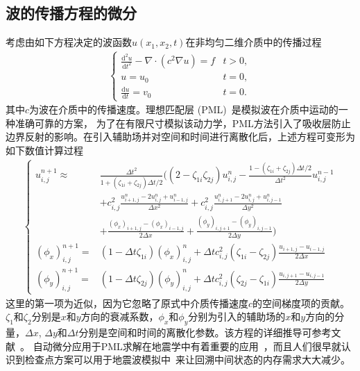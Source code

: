 \documentclass[A4,twoside,UTF8]{ctexart}
\def\D{\mathrm{d}}
\begin{document}
\baselineskip
\subsection{波的传播方程的微分}
考虑由如下方程决定的波函数$u(x_1, x_2, t)$在非均匀二维介质中的传播过程
\begin{align}
    \begin{cases}
    \frac{\D^2 u}{\D t^2} - \nabla\cdot(c^2\nabla u) = f & t>0,\\
    u = u_0 & t=0,\\
    \frac{\D u}{\D t} = v_0 & t=0.
    \end{cases}
\end{align}
其中$c$为波在介质中的传播速度。理想匹配层 (PML)~\cite{Berenger1994,Roden2000,MaKoEz08}是模拟波在介质中运动的一种准确可靠的方案，
为了在有限尺寸模拟该动力学，PML方法引入了吸收层防止边界反射的影响。在引入辅助场并对空间和时间进行离散化后，上述方程可变形为如下数值计算过程
\begin{align}
    \begin{cases}
        u^{n+1}_{i,j} \approx &\frac{\Delta t^2}{1+(\zeta_{1i}+\zeta_{2j})\Delta t/2}\bigg(
        \left(2-\zeta_{1i}\zeta_{2j}\right)u_{i,j}^n - \frac{1-(\zeta_{1i}+\zeta_{2j})\Delta t/2}{\Delta t^2}u^{n-1}_{i,j}\\
        &+ c_{i,j}^2\frac{u_{i+1,j}^n-2u_{i,j}^n+u_{i-1,j}^n}{\Delta x^2} + c_{i,j}^2\frac{u_{i,j+1}^n-2u_{i,j}^n+u_{i,j-1}^n}{\Delta y^2}\\
        &+ \frac{(\phi_x)_{i+1,j}-(\phi_x)_{i-1,j}}{2\Delta x} + \frac{(\phi_y)_{i,j+1}-(\phi_y)_{i,j-1}}{2\Delta y}\bigg)\\
        (\phi_x)_{i,j}^{n+1} =& (1-\Delta t \zeta_{1i})(\phi_x)_{i,j}^n + \Delta t c_{i,j}^2 (\zeta_{1i}-\zeta_{2j})\frac{u_{i+1,j}-u_{i-1,j}}{2\Delta x}\\
        (\phi_y)_{i,j}^{n+1} =& (1-\Delta t \zeta_{2j})(\phi_y)_{i,j}^n + \Delta t c_{i,j}^2 (\zeta_{2j}-\zeta_{1i})\frac{u_{i,j+1}-u_{i,j-1}}{2\Delta y}
    \end{cases}
\end{align}
这里的第一项为近似，因为它忽略了原式中介质传播速度$c$的空间梯度项的贡献。$\zeta_1$和$\zeta_2$分别是$x$和$y$方向的衰减系数，$\phi_x$和$\phi_y$分别为引入的辅助场的$x$和$y$方向的分量，$\Delta x$, $\Delta y$和$\Delta t$分别是空间和时间的离散化参数。该方程的详细推导可参考文献~\cite{Grote2010}。
自动微分应用于PML求解在地震学中有着重要的应用~\cite{Zhu2020}，而且人们很早就认识到检查点方案可以用于地震波模拟中~\cite{Symes2007}来让回溯中间状态的内存需求大大减少。
\end{document}
